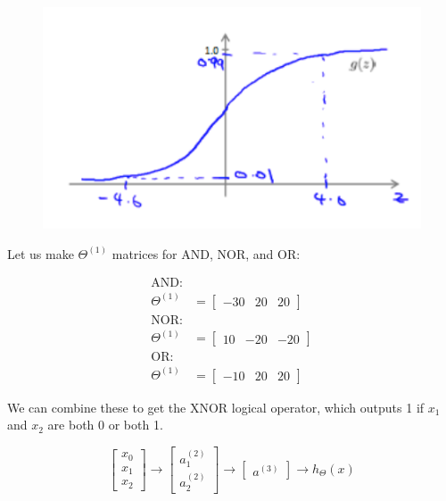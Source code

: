     \begin{figure}[hbt!]
        \centering
        \includegraphics[scale=0.75]{Resources/OR_Net_Sigmoid}
    \end{figure}

    \noindent Let us make $\Theta^{(1)}$ matrices for AND, NOR, and OR:

    \begin{align*}
        \text{AND:} \\
        \Theta^{(1)} &= \begin{bmatrix}
                            -30 & 20 & 20
        \end{bmatrix} \\
        \text{NOR:} \\
        \Theta^{(1)} &= \begin{bmatrix}
                            10 & -20 & -20
        \end{bmatrix} \\
        \text{OR:} \\
        \Theta^{(1)} &= \begin{bmatrix}
                            -10 & 20 & 20
        \end{bmatrix}
    \end{align*}

    \noindent We can combine these to get the XNOR logical operator, which outputs 1 if $x_1$ and $x_2$
    are both 0 or both 1.

    \begin{equation*}
        \begin{bmatrix}
            x_0 \\
            x_1 \\
            x_2
        \end{bmatrix}
        \to
        \begin{bmatrix}
            a_1^{(2)} \\
            a_2^{(2)}
        \end{bmatrix}
        \to
        \begin{bmatrix}
            a^{(3)}
        \end{bmatrix}
        \to h_\Theta(x)
    \end{equation*}

